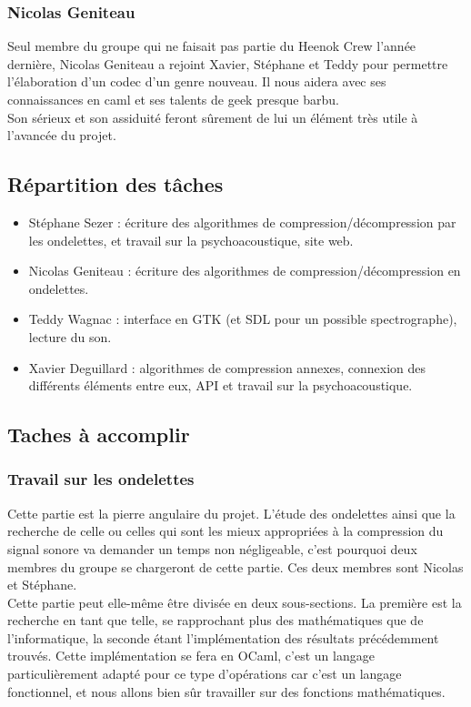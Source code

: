 		\subsubsection{Nicolas Geniteau}
Seul membre du  groupe qui ne faisait pas partie  du Heenok Crew l'année
dernière,  Nicolas Geniteau  a rejoint  Xavier,  Stéphane et  Teddy pour
permettre l'élaboration  d'un codec d'un genre  nouveau.  Il nous aidera
avec ses connaissances en caml et ses talents de geek presque barbu.\\
Son sérieux  et son  assiduité feront  sûrement de  lui un  élément très
utile à l'avancée du projet.

	\subsection{Répartition des tâches}
\begin{itemize}
	\item Stéphane Sezer : écriture des  algorithmes de
compression/décompression par les ondelettes, et travail sur la
psychoacoustique, site web.
	\item Nicolas Geniteau : écriture des algorithmes de
compression/décompression en ondelettes.
	\item Teddy Wagnac : interface en GTK (et SDL pour un possible
spectrographe), lecture du son.
	\item  Xavier  Deguillard  :  algorithmes  de  compression  annexes,
	connexion des différents éléments entre  eux,  API et travail sur la
	psychoacoustique.
\end{itemize}

\newpage

	\subsection{Taches à accomplir}

		\subsubsection{Travail sur les ondelettes}
Cette partie est la pierre  angulaire du projet.  L'étude des ondelettes
ainsi que la recherche de celle ou celles qui sont les mieux appropriées
à la compression du signal sonore  va demander un temps non négligeable,
c'est pourquoi  deux membres  du groupe se  chargeront de  cette partie.
Ces deux membres sont Nicolas et Stéphane.\\
Cette partie  peut  elle-même  être  divisée  en deux sous-sections.  La
première est  la recherche en  tant que telle,  se  rapprochant plus des
mathématiques que de  l'informatique,  la seconde étant l'implémentation
des résultats  précédemment  trouvés.  Cette  implémentation  se fera en
OCaml,   c'est  un   langage  particulièrement   adapté  pour   ce  type
d'opérations car c'est un langage  fonctionnel,  et nous allons bien sûr
travailler sur des fonctions mathématiques.

